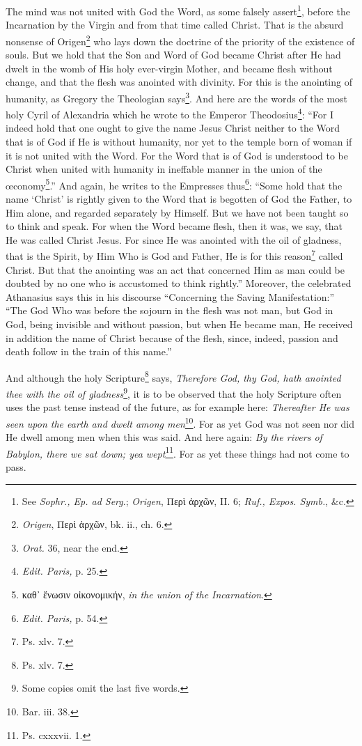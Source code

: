 The mind was not united with God the Word, as some falsely assert\footnote{See \emph{Sophr., Ep. ad Serg}.; \emph{Origen}, \textgreek{Περὶ ἀρχῶν}, II. 6; \emph{Ruf., Expos. Symb.}, \&c.}, before the Incarnation by the Virgin and from that time called Christ. That is the absurd nonsense of Origen\footnote{\emph{Origen}, \textgreek{Περὶ ἀρχῶν,} bk. ii., ch. 6.} who lays down the doctrine of the priority of the existence of souls. But we hold that the Son and Word of God became Christ after He had dwelt in the womb of His holy ever-virgin Mother, and became flesh without change, and that the flesh was anointed with divinity. For this is the anointing of humanity, as Gregory the Theologian says\footnote{\emph{Orat. }36, near the end.}. And here are the words of the most holy Cyril of Alexandria which he wrote to the Emperor Theodosius\footnote{\emph{Edit. Paris, }p. 25.}: “For I indeed hold that one ought to give the name Jesus Christ neither to the Word that is of God if He is without humanity, nor yet to the temple born of woman if it is not united with the Word. For the Word that is of God is understood to be Christ when united with humanity in ineffable manner in the union of the œconomy\footnote{\textgreek{καθ᾽ ἕνωσιν οἰκονομικήν}, \emph{in the union of the Incarnation}.}.” And again, he writes to the Empresses thus\footnote{\emph{Edit. Paris, }p. 54.}: “Some hold that the name ‘Christ’ is rightly given to the Word that is begotten of God the Father, to Him alone, and regarded separately by Himself. But we have not been taught so to think and speak. For when the Word became flesh, then it was, we say, that He was called Christ Jesus. For since He was anointed with the oil of gladness, that is the Spirit, by Him Who is God and Father, He is for this reason\footnote{Ps. xlv. 7.} called Christ. But that the anointing was an act that concerned Him as man could be doubted by no one who is accustomed to think rightly.” Moreover, the celebrated Athanasius says this in his discourse “Concerning the Saving Manifestation:” “The God Who was before the sojourn in the flesh was not man, but God in God, being invisible and without passion, but when He became man, He received in addition the name of Christ because of the flesh, since, indeed, passion and death follow in the train of this name.”

And although the holy Scripture\footnote{Ps. xlv. 7.} says, \emph{Therefore God, thy God, hath anointed thee with the oil of gladness}\footnote{Some copies omit the last five words.}, it is to be observed that the holy Scripture often uses the past tense instead of the future, as for example here: \emph{Thereafter He was seen upon the earth and dwelt among men}\footnote{Bar. iii. 38.}. For as yet God was not seen nor did He dwell among men when this was said. And here again: \emph{By the rivers of Babylon, there we sat down; yea wept}\footnote{Ps. cxxxvii. 1.}. For as yet these things had not come to pass.


